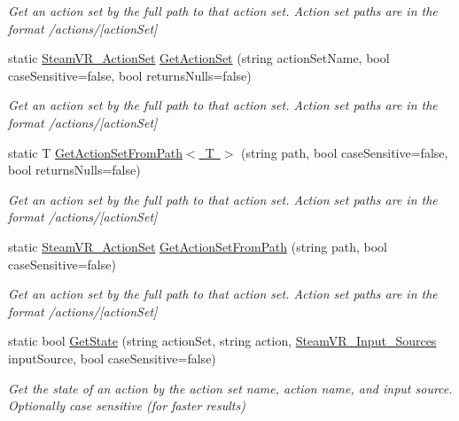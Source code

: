 \begin{DoxyCompactItemize}
\begin{DoxyCompactList}\small\item\em Get an action set by the full path to that action set. Action set paths are in the format /actions/\mbox{[}action\+Set\mbox{]} \end{DoxyCompactList}\item 
static \mbox{\hyperlink{class_valve_1_1_v_r_1_1_steam_v_r___action_set}{Steam\+V\+R\+\_\+\+Action\+Set}} \mbox{\hyperlink{class_valve_1_1_v_r_1_1_steam_v_r___input_a645e9f34de97217c31c20ba913c8d3e6}{Get\+Action\+Set}} (string action\+Set\+Name, bool case\+Sensitive=false, bool returns\+Nulls=false)
\begin{DoxyCompactList}\small\item\em Get an action set by the full path to that action set. Action set paths are in the format /actions/\mbox{[}action\+Set\mbox{]} \end{DoxyCompactList}\item 
static T \mbox{\hyperlink{class_valve_1_1_v_r_1_1_steam_v_r___input_a159b8db4e142e2250aaa1b2e1d1e38b9}{Get\+Action\+Set\+From\+Path$<$ T $>$}} (string path, bool case\+Sensitive=false, bool returns\+Nulls=false)
\begin{DoxyCompactList}\small\item\em Get an action set by the full path to that action set. Action set paths are in the format /actions/\mbox{[}action\+Set\mbox{]} \end{DoxyCompactList}\item 
static \mbox{\hyperlink{class_valve_1_1_v_r_1_1_steam_v_r___action_set}{Steam\+V\+R\+\_\+\+Action\+Set}} \mbox{\hyperlink{class_valve_1_1_v_r_1_1_steam_v_r___input_ae8457bd35fd6eb86e62371d56af44254}{Get\+Action\+Set\+From\+Path}} (string path, bool case\+Sensitive=false)
\begin{DoxyCompactList}\small\item\em Get an action set by the full path to that action set. Action set paths are in the format /actions/\mbox{[}action\+Set\mbox{]} \end{DoxyCompactList}\item 
static bool \mbox{\hyperlink{class_valve_1_1_v_r_1_1_steam_v_r___input_aca0c5b17c9729bd900e7132fa98b3a36}{Get\+State}} (string action\+Set, string action, \mbox{\hyperlink{namespace_valve_1_1_v_r_a82e5bf501cc3aa155444ee3f0662853f}{Steam\+V\+R\+\_\+\+Input\+\_\+\+Sources}} input\+Source, bool case\+Sensitive=false)
\begin{DoxyCompactList}\small\item\em Get the state of an action by the action set name, action name, and input source. Optionally case sensitive (for faster results) \end{DoxyCompactList}\item 

\end{DoxyCompactItemize}
